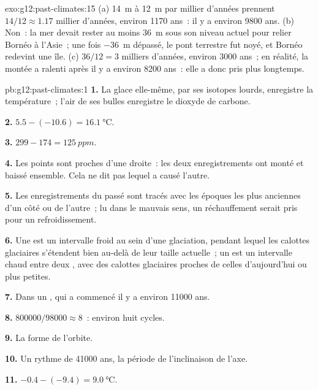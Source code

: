 \begin{solution}{exo:g12:past-climates:15}
(a) \qty{14}{m} à \qty{12}{m} par millier d'années prennent $14/12 \approx
1.17$ millier d'années, environ \num{1170} ans~: il y a environ \num{9800}
ans. (b) Non~: la mer devait rester au moins \qty{36}{m} sous son niveau
actuel pour relier Bornéo à l'Asie~; une fois \qty{-36}{m} dépassé, le pont
terrestre fut noyé, et Bornéo redevint une île. (c) $36/12 = 3$ milliers
d'années, environ \num{3000} ans~; en réalité, la montée a ralenti après
il y a environ \num{8200} ans~: elle a donc pris plus longtemps.
\end{solution}

\begin{solution}{pb:g12:past-climates:1}
\textbf{1.} La glace elle-même, par ses isotopes lourds, enregistre la
température~; l'air de ses bulles enregistre le dioxyde de carbone.

\textbf{2.} $5.5 - (-10.6) = \qty{16.1}{\degreeCelsius}$.

\textbf{3.} $299 - 174 = \qty{125}{ppm}$.

\textbf{4.} Les points sont proches d'une droite~: les deux
enregistrements ont monté et baissé ensemble. Cela ne dit pas lequel a
causé l'autre.

\textbf{5.} Les enregistrements du passé sont tracés avec les époques les
plus anciennes d'un côté ou de l'autre~; lu dans le mauvais sens, un
réchauffement serait pris pour un refroidissement.

\textbf{6.} Une  est un intervalle froid au sein d'une
glaciation, pendant lequel les calottes glaciaires s'étendent bien au-delà
de leur taille actuelle~; un  est un intervalle chaud entre
deux , avec des calottes glaciaires proches de celles
d'aujourd'hui ou plus petites.

\textbf{7.} Dans un , qui a commencé il y a environ
\num{11000} ans.

\textbf{8.} $\num{800000}/\num{98000} \approx 8$~: environ huit cycles.

\textbf{9.} La forme de l'orbite.

\textbf{10.} Un rythme de \num{41000} ans, la période de l'inclinaison de
l'axe.

\textbf{11.} $-0.4 - (-9.4) = \qty{9.0}{\degreeCelsius}$.


\end{solution}
